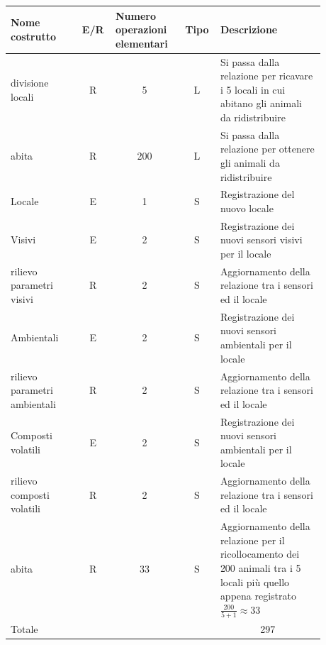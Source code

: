 \documentclass[12pt,a4paper]{article}
\begin{document}
\begin{center}\setlength{\extrarowheight}{1.5pt}\begin{longtable}{|p{0.2\linewidth}|p{0.1\linewidth}|p{0.175\linewidth}|p{0.1\linewidth}|p{0.3\linewidth}|}\hline \textbf{Nome costrutto}   & \multicolumn{1}{|c|}{\textbf{E/R}} & \textbf{Numero operazioni elementari} & \multicolumn{1}{|c|}{\textbf{Tipo}} & \textbf{Descrizione}\\ 
\hline
divisione locali
 & 
\multicolumn{1}{|c|}{R}
 & 
\multicolumn{1}{|c|}{5}
 & 
\multicolumn{1}{|c|}{L}
 & 
Si passa dalla relazione per ricavare i 5 locali in cui abitano gli animali da ridistribuire
\\
\hline
abita
 & 
\multicolumn{1}{|c|}{R}
 & 
\multicolumn{1}{|c|}{200}
 & 
\multicolumn{1}{|c|}{L}
 & 
Si passa dalla relazione per ottenere gli animali da ridistribuire
\\
\hline
Locale
 & 
\multicolumn{1}{|c|}{E}
 & 
\multicolumn{1}{|c|}{1}
 & 
\multicolumn{1}{|c|}{S}
 & 
Registrazione del nuovo locale
\\
\hline
Visivi
 & 
\multicolumn{1}{|c|}{E}
 & 
\multicolumn{1}{|c|}{2}
 & 
\multicolumn{1}{|c|}{S}
 & 
Registrazione dei nuovi sensori visivi per il locale
\\
\hline
rilievo parametri visivi
 & 
\multicolumn{1}{|c|}{R}
 & 
\multicolumn{1}{|c|}{2}
 & 
\multicolumn{1}{|c|}{S}
 & 
Aggiornamento della relazione tra i sensori ed il locale
\\
\hline
Ambientali
 & 
\multicolumn{1}{|c|}{E}
 & 
\multicolumn{1}{|c|}{2}
 & 
\multicolumn{1}{|c|}{S}
 & 
Registrazione dei nuovi sensori ambientali per il locale
\\
\hline
rilievo parametri ambientali
 & 
\multicolumn{1}{|c|}{R}
 & 
\multicolumn{1}{|c|}{2}
 & 
\multicolumn{1}{|c|}{S}
 & 
Aggiornamento della relazione tra i sensori ed il locale
\\
\hline
Composti volatili
 & 
\multicolumn{1}{|c|}{E}
 & 
\multicolumn{1}{|c|}{2}
 & 
\multicolumn{1}{|c|}{S}
 & 
Registrazione dei nuovi sensori ambientali per il locale
\\
\hline
rilievo composti volatili
 & 
\multicolumn{1}{|c|}{R}
 & 
\multicolumn{1}{|c|}{2}
 & 
\multicolumn{1}{|c|}{S}
 & 
Aggiornamento della relazione tra i sensori ed il locale
\\
\hline
abita
 & 
\multicolumn{1}{|c|}{R}
 & 
\multicolumn{1}{|c|}{33}
 & 
\multicolumn{1}{|c|}{S}
 & 
Aggiornamento della relazione per il ricollocamento dei 200 animali tra i 5 locali più quello appena registrato $\frac{200}{5+1}\approx 33$
\\
\hline
\multicolumn{4}{|l|}{Totale}
 & 
\multicolumn{1}{|c|}{297}
\\
\hline
\end{longtable}\end{center}
\end{document}
